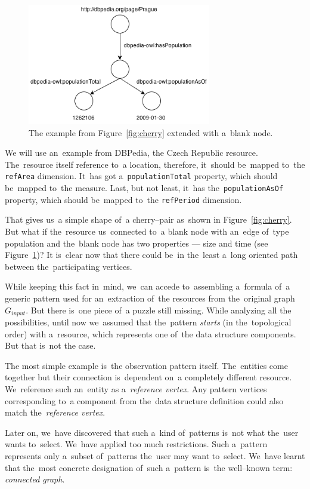 \begin{figure}
	\centering
	\includegraphics[width=80mm]{images/cherry_blank.png}
	\caption{The example from Figure~\ref{fig:cherry} extended with a~blank node.}
	\label{fig:cherry-blank}
\end{figure}

We will use an~example from DBPedia, 
the Czech Republic resource. The~resource itself reference to~a location, 
therefore, it~should be~mapped to~the \verb|refArea| dimension. It~has got a~\verb|populationTotal| property, which should be~mapped to~the measure. Last, but not 
least, it~has the~\verb|populationAsOf| property, which should be~mapped to~the 
\verb|refPeriod| dimension.

That gives us~a simple shape of~a cherry--pair as~shown in
Figure~\ref{fig:cherry}. But what 
if the~resource us~connected to~a blank node with an~edge of~type 
population and the~blank node has two properties --- size and time
(see Figure~\ref{fig:cherry-blank})?
It is~clear now that there could be~in the~least a~long oriented path between the~participating 
vertices.

While keeping this fact in~mind, we~can accede to~assembling a~formula of~a generic pattern used for an~extraction of~the resources from the~original graph $G_{input}$. But 
there is~one piece of~a puzzle still missing. While analyzing all the
possibilities, until now we~assumed that the~pattern \emph{starts} (in the~topological order)
with a~resource, which represents one of~the data structure components. But that is~not  
the case.

The most simple example is~the observation pattern itself. The~entities come together but their connection is~dependent on~a completely 
different resource. We~reference such an~entity
as a~\emph{reference vertex}. Any pattern vertices corresponding to~a component from the~data structure definition could also match the~\emph{reference vertex}.

Later on, we~have discovered that such a~kind of~patterns is~not what the~user 
wants to~select. We~have applied too much restrictions. Such a~pattern
represents only a~subset of~patterns the~user may want to~select. We~have learnt
that the~most concrete designation of~such a~pattern is~the well--known term:
\emph{connected graph}.

